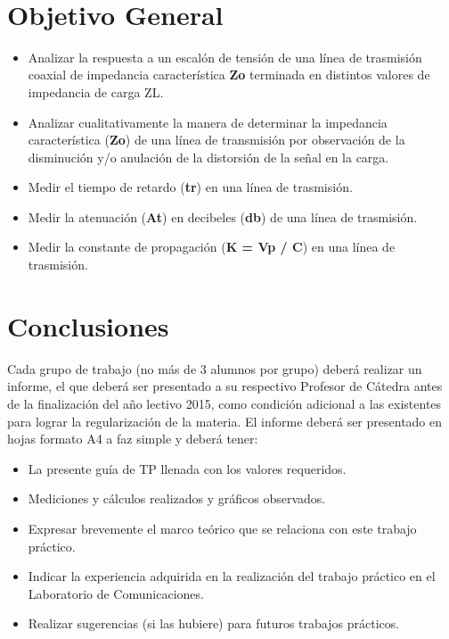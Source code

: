 \documentclass[12pt]{article}
\makeatletter
\let\thedate\@date
\makeatother
\begin{document}
\begin{titlepage}
	{\large \thedate}\\[2 cm]
 
	\vfill
	
\end{titlepage}


\tableofcontents
\pagebreak

\section{Objetivo General}

\begin{itemize}
 \item Analizar la respuesta a un escalón de tensión de una línea de trasmisión coaxial de impedancia característica \textbf{Zo} terminada en distintos valores de impedancia de carga ZL.
 \item Analizar cualitativamente la manera de determinar la impedancia característica (\textbf{Zo}) de una línea de transmisión por observación de la disminución y/o anulación de la distorsión de la señal en la carga.
 \item Medir el tiempo de retardo (\textbf{tr}) en una línea de trasmisión.
 \item Medir la atenuación (\textbf{At}) en decibeles (\textbf{db}) de una línea de trasmisión.
 \item Medir la constante de propagación (\textbf{K = Vp / C}) en una línea de trasmisión.
 \end{itemize} 

\section{Conclusiones}
Cada grupo de trabajo (no más de 3 alumnos por grupo) deberá realizar un informe, el que deberá ser presentado a su respectivo Profesor de Cátedra antes de la finalización del año lectivo 2015, como condición adicional a las existentes para lograr la regularización de la materia.
El informe deberá ser presentado en hojas formato A4 a faz simple y deberá tener:

\begin{itemize}
 \item La presente guía de TP llenada con los valores requeridos.
 \item Mediciones y cálculos realizados y gráficos observados.
 \item Expresar brevemente el marco teórico que se relaciona con este trabajo práctico.
 \item Indicar la experiencia adquirida en la realización del trabajo práctico en el Laboratorio de Comunicaciones.
 \item Realizar sugerencias (si las hubiere) para futuros trabajos prácticos.
 \end{itemize} 
\end{document}
